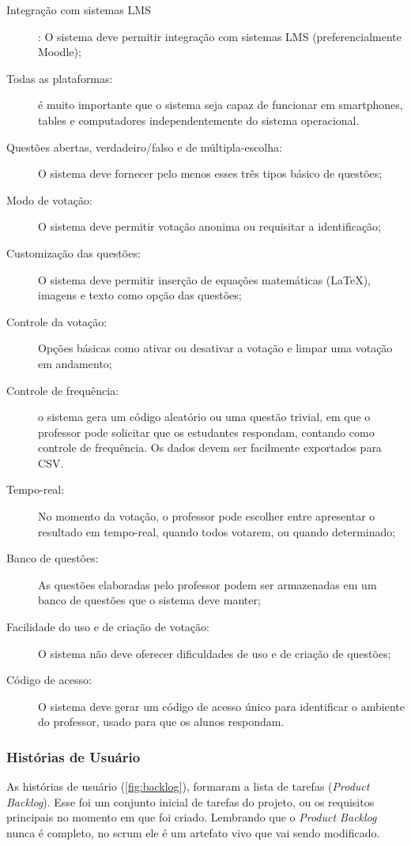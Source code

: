 \begin{description}
\item[Integração com sistemas LMS]: O sistema deve permitir integração com
sistemas LMS (preferencialmente Moodle);
\item[Todas as plataformas:] é muito importante que o sistema seja capaz
de funcionar em smartphones, tables e computadores independentemente
do sistema operacional.
\item[Questões abertas, verdadeiro/falso e de múltipla-escolha:] O sistema
deve fornecer pelo menos esses três tipos básico de questões;
\item[Modo de votação:] O sistema deve permitir votação anonima ou requisitar
a identificação;
\item[Customização das questões:] O sistema deve permitir inserção de equações
matemáticas (\LaTeX), imagens e texto como opção das questões;
\item[Controle da votação:] Opções básicas como ativar ou desativar a votação
e limpar uma votação em andamento;
\item[Controle de frequência:] o sistema gera um código aleatório ou uma
questão trivial, em que o professor pode solicitar que os estudantes
respondam, contando como controle de frequência. Os dados devem ser
facilmente exportados para CSV.
\item[Tempo-real:] No momento da votação, o professor pode escolher entre
apresentar o resultado em tempo-real, quando todos votarem, ou quando
determinado;
\item[Banco de questões:] As questões elaboradas pelo professor podem ser
armazenadas em um banco de questões que o sistema deve manter;
\item[Facilidade do uso e de criação de votação:] O sistema não deve oferecer
dificuldades de uso e de criação de questões;
\item[Código de acesso:] O sistema deve gerar um código de acesso único para
identificar o ambiente do professor, usado para que os alunos respondam.
\end{description}

\subsubsection{Histórias de Usuário}

As histórias de usuário (\autoref{fig:backlog}), formaram a lista de tarefas (\textit{Product Backlog}).
Esse foi um conjunto inicial de tarefas do projeto, ou os requisitos principais no momento em que foi criado. Lembrando que o \textit{Product Backlog} nunca é completo, no scrum ele é um artefato vivo que vai sendo modificado.

